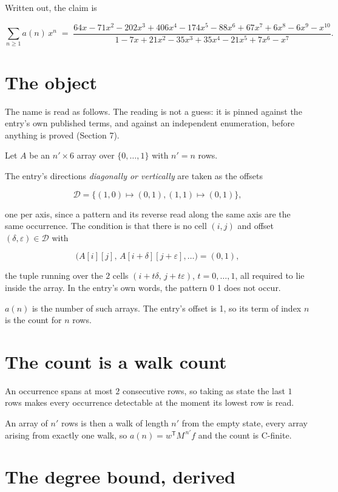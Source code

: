 \documentclass[11pt]{article}
\theoremstyle{definition}
\begin{document}
Written out, the claim is

\[\sum_{n \ge 1} a(n)\,x^n \;=\; \frac{64x - 71x^{2} - 202x^{3} + 406x^{4} - 174x^{5} - 88x^{6} + 67x^{7} + 6x^{8} - 6x^{9} - x^{10}}{1 - 7x + 21x^{2} - 35x^{3} + 35x^{4} - 21x^{5} + 7x^{6} - x^{7}}.\]

\section{The object}

The name is read as follows. The reading is not a guess: it is pinned against the entry's own published terms, and against an independent enumeration, before anything is proved (Section 7).

Let $A$ be an $n' \times 6$ array over $\{0,\dots,1\}$ with $n' = n$ rows.

The entry's directions {\itshape diagonally or vertically} are taken as the offsets

\[\mathcal{D} = \{(1,0)\mapsto(0,1), (1,1)\mapsto(0,1)\},\]

one per axis, since a pattern and its reverse read along the same axis are the same occurrence. The condition is that there is no cell $(i,j)$ and offset $(\delta,\varepsilon)\in\mathcal{D}$ with

\[\bigl(A[i][j],\,A[i{+}\delta][j{+}\varepsilon],\dots\bigr) = (0, 1),\]

the tuple running over the $2$ cells $(i+t\delta,\,j+t\varepsilon)$, $t = 0,\dots,1$, all required to lie inside the array. In the entry's own words, the pattern 0 1 does not occur.

$a(n)$ is the number of such arrays. The entry's offset is 1, so its term of index $n$ is the count for $n$ rows.

\section{The count is a walk count}

An occurrence spans at most $2$ consecutive rows, so taking as state the last $1$ rows makes every occurrence detectable at the moment its lowest row is read.

An array of $n'$ rows is then a walk of length $n'$ from the empty state, every array arising from exactly one walk, so $a(n) = w^{\mathsf T}M^{\,n'}f$ and the count is C-finite.

\section{The degree bound, derived}
\end{document}
